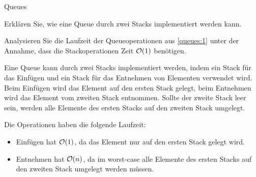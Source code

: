 \documentclass{article}
\begin{document}
\begin{exercises}{Queues}
\item\label{queues:1} Erklären Sie, wie eine Queue durch zwei Stacks implementiert werden kann.
\item Analysieren Sie die Laufzeit der Queueoperationen aus \ref{queues:1} unter der Annahme, dass die Stackoperationen Zeit $\mathcal{O}(1)$ benötigen.
\end{exercises}

\begin{solutions}
  \item Eine Queue kann durch zwei Stacks implementiert werden, indem ein Stack für das Einfügen und ein Stack für das Entnehmen von Elementen verwendet wird. Beim Einfügen wird das Element auf den ersten Stack gelegt, beim Entnehmen wird das Element vom zweiten Stack entnommen. Sollte der zweite Stack leer sein, werden alle Elemente des ersten Stacks auf den zweiten Stack umgelegt.
  \item Die Operationen haben die folgende Laufzeit:
  \begin{itemize}
    \item Einfügen hat $\mathcal{O}(1)$, da das Element nur auf den ersten Stack gelegt wird.
    \item Entnehmen hat $\mathcal{O}(n)$, da im worst-case alle Elemente des ersten Stacks auf den zweiten Stack umgelegt werden müssen.
  \end{itemize}
\end{solutions}
\end{document}
